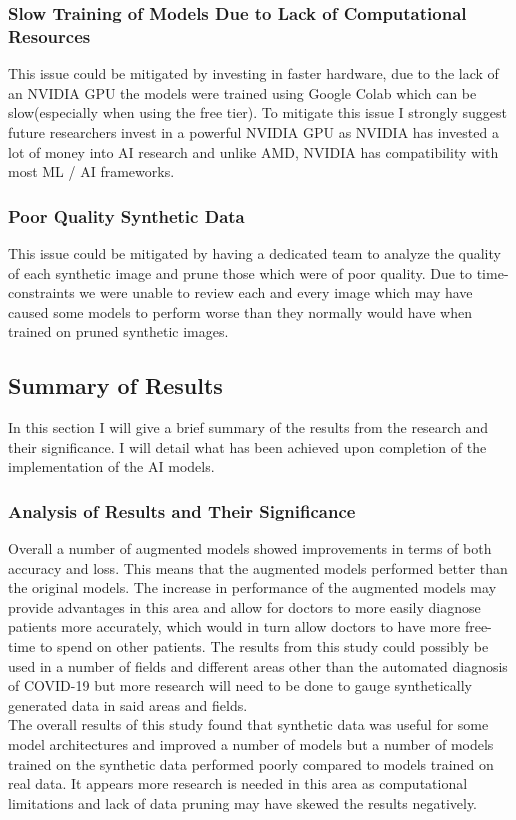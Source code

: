 \subsubsection{Slow Training of Models Due to Lack of Computational Resources}
This issue could be mitigated by investing in faster hardware, due to the lack of an NVIDIA GPU the models were trained using Google Colab which can be slow(especially when using the free tier).  To mitigate this issue I strongly suggest future researchers invest in a powerful NVIDIA GPU as NVIDIA has invested a lot of money into AI research and unlike AMD, NVIDIA has compatibility with most ML / AI frameworks.
\subsubsection{Poor Quality Synthetic Data}
This issue could be mitigated by having a dedicated team to analyze the quality of each synthetic image and prune those which were of poor quality.  Due to time-constraints we were unable to review each and every image which may have caused some models to perform worse than they normally would have when trained on pruned synthetic images.
\subsection{Summary of Results}
In this section I will give a brief summary of the results from the research and their significance.  I will detail what has been achieved upon completion of the implementation of the AI models.
\subsubsection{Analysis of Results and Their Significance}
Overall a number of augmented models showed improvements in terms of both accuracy and loss.  This means that the augmented models performed better than the original models.  The increase in performance of the augmented models may provide advantages in this area and allow for doctors to more easily diagnose patients more accurately, which would in turn allow doctors to have more free-time to spend on other patients.  The results from this study could possibly be used in a number of fields and different areas other than the automated diagnosis of COVID-19 but more research will need to be done to gauge synthetically generated data in said areas and fields. 
\\
The overall results of this study found that synthetic data was useful for some model architectures and improved a number of models but a number of models trained on the synthetic data performed poorly compared to models trained on real data.  It appears more research is needed in this area as computational limitations and lack of data pruning may have skewed the results negatively.
